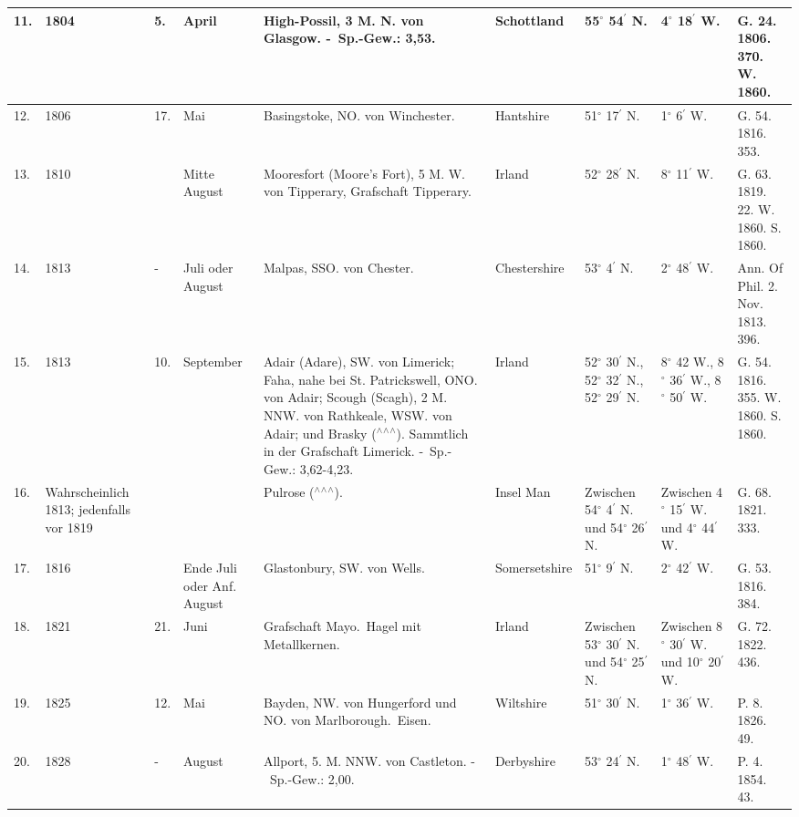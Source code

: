 \documentclass[a4paper, 11pt, oneside, polutonikogreek, german]{article}
\begin{document}
\begin{table}[!ht]
\begin{tabular}{|l|l|l|l|l|l|l|l|l|}
        11. & 1804 & 5. & April & High-Possil, 3 M. N. von Glasgow. - Sp.-Gew.: 3,53. & Schottland & 55$^\circ$ 54$^\prime$ N. & 4$^\circ$ 18$^\prime$ W. & G. 24. 1806. 370. W. 1860. \\ \hline
        12. & 1806 & 17. & Mai & Basingstoke, NO. von Winchester. & Hantshire & 51$^\circ$ 17$^\prime$ N. & 1$^\circ$ 6$^\prime$ W. & G. 54. 1816. 353. \\ \hline
        13. & 1810 & ~ & Mitte August & Mooresfort (Moore’s Fort), 5 M. W. von Tipperary, Grafschaft Tipperary. & Irland & 52$^\circ$ 28$^\prime$ N. & 8$^\circ$ 11$^\prime$ W. & G. 63. 1819. 22. W. 1860. S. 1860. \\ \hline
        14. & 1813 & - & Juli oder August & Malpas, SSO. von Chester. & Chestershire & 53$^\circ$ 4$^\prime$ N. & 2$^\circ$ 48$^\prime$ W. & Ann. Of Phil. 2. Nov. 1813. 396. \\ \hline
        15. & 1813 & 10. & September & Adair (Adare), SW. von Limerick; Faha, nahe bei St. Patrickswell, ONO. von Adair; Scough (Scagh), 2 M. NNW. von Rathkeale, WSW. von Adair; und Brasky ($^\wedge$$^\wedge$$^\wedge$). Sammtlich in der Grafschaft Limerick. - Sp.-Gew.: 3,62-4,23. & Irland & 52$^\circ$ 30$^\prime$ N., 52$^\circ$ 32$^\prime$ N., 52$^\circ$ 29$^\prime$ N. & 8$^\circ$ 42 W., 8$^\circ$ 36$^\prime$ W., 8$^\circ$ 50$^\prime$ W. & G. 54. 1816. 355. W. 1860. S. 1860. \\ \hline
        16. & Wahrscheinlich 1813; jedenfalls vor 1819 & ~ & ~ & Pulrose ($^\wedge$$^\wedge$$^\wedge$). & Insel Man & Zwischen 54$^\circ$ 4$^\prime$ N. und 54$^\circ$ 26$^\prime$ N. & Zwischen 4$^\circ$ 15$^\prime$ W. und 4$^\circ$ 44$^\prime$ W. & G. 68. 1821. 333. \\ \hline
        17. & 1816 & ~ & Ende Juli oder Anf. August & Glastonbury, SW. von Wells. & Somersetshire & 51$^\circ$ 9$^\prime$ N. & 2$^\circ$ 42$^\prime$ W. & G. 53. 1816. 384. \\ \hline
        18. & 1821 & 21. & Juni & Grafschaft Mayo. Hagel mit Metallkernen. & Irland & Zwischen 53$^\circ$ 30$^\prime$ N. und 54$^\circ$ 25$^\prime$ N. & Zwischen 8$^\circ$ 30$^\prime$ W. und 10$^\circ$ 20$^\prime$ W. & G. 72. 1822. 436. \\ \hline
        19. & 1825 & 12. & Mai & Bayden, NW. von Hungerford und NO. von Marlborough. Eisen. & Wiltshire & 51$^\circ$ 30$^\prime$ N. & 1$^\circ$ 36$^\prime$ W. & P. 8. 1826. 49. \\ \hline
        20. & 1828 & - & August & Allport, 5. M. NNW. von Castleton. - Sp.-Gew.: 2,00. & Derbyshire & 53$^\circ$ 24$^\prime$ N. & 1$^\circ$ 48$^\prime$ W. & P. 4. 1854. 43. \\ \hline

\end{tabular}
\end{table}
\end{document}
